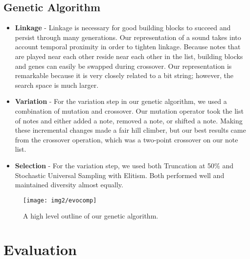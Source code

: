 \documentclass{pnastwo}
\begin{document}
\begin{article}
\subsection{Genetic Algorithm}
\begin{itemize}
\item \textbf{Linkage} - Linkage is necessary for good building blocks to succeed and persist through many generations. Our representation of a sound takes into account temporal proximity in order to tighten linkage. Because notes that are played near each other reside near each other in the list, building blocks and genes can easily be swapped during crossover. Our representation is remarkable because it is very closely related to a bit string; however, the search space is much larger.\\
\item \textbf{Variation} - For the variation step in our genetic algorithm, we used a combination of mutation and crossover. Our mutation operator took the list of notes and either added a note, removed a note, or shifted a note. Making these incremental changes made a fair hill climber, but our best results came from the crossover operation, which was a two-point crossover on our note list. \\
\item \textbf{Selection} - For the variation step, we used both Truncation at 50\% and Stochastic Universal Sampling with Elitism. Both performed well and maintained diversity almost equally.
\end{itemize}

\begin{figure*}
\centerline{\texttt{[image: img2/evocomp]}}
\caption{A high level outline of our genetic algorithm.}\label{fig2}
\end{figure*}

\section{Evaluation}

\end{article}
\end{document}
